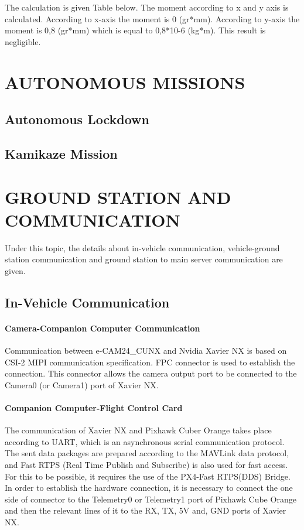 \documentclass[12pt]{article}
\begin{document}

The calculation is given Table  below. The moment according to x and y axis is calculated. According to x-axis the moment is 0 (gr*mm). According to y-axis the moment is 0,8 (gr*mm) which is equal to 0,8*10-6 (kg*m). This result is negligible. 



\section{AUTONOMOUS MISSIONS}
\subsection{Autonomous Lockdown}
\subsection{Kamikaze Mission}

\section{GROUND STATION AND COMMUNICATION}
Under this topic, the details about in-vehicle communication, vehicle-ground station communication and ground station to main server communication are given.
\subsection{In-Vehicle Communication}
\paragraph*{Camera-Companion Computer Communication} Communication between e-CAM24\_CUNX and Nvidia Xavier NX is based on CSI-2 MIPI communication specification. FPC connector is used to establish the connection. This connector allows the camera output port to be connected to the Camera0 (or Camera1) port of Xavier NX.

\paragraph*{Companion Computer-Flight Control Card} The communication of Xavier NX and Pixhawk Cuber Orange takes place according to UART, which is an asynchronous serial communication protocol. The sent data packages are prepared according to the MAVLink data protocol, and Fast RTPS (Real Time Publish and Subscribe) is also used for fast access. For this to be possible, it requires the use of the PX4-Fast RTPS(DDS) Bridge. In order to establish the hardware connection, it is necessary to connect the one side of connector to the Telemetry0 or Telemetry1 port of Pixhawk Cube Orange and then the relevant lines of it to the RX, TX, 5V and, GND ports of Xavier NX.
\end{document}
